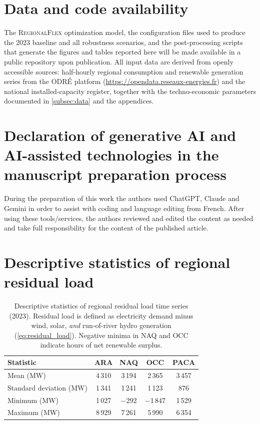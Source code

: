 \documentclass[12pt]{article}
\begin{document}
\section*{Data and code availability}

\noindent The \textsc{RegionalFlex} optimization model, the configuration files used to produce the 2023 baseline and all robustness scenarios, and the post-processing scripts that generate the figures and tables reported here will be made available in a public repository upon publication. All input data are derived from openly accessible sources: half-hourly regional consumption and renewable generation series from the ODR\'E platform (\url{https://opendata.reseaux-energies.fr}) and the national installed-capacity register, together with the techno-economic parameters documented in \cref{subsec:data} and the appendices.

\section*{Declaration of generative AI and AI-assisted technologies in the manuscript preparation process}

\noindent During the preparation of this work the authors used ChatGPT, Claude and Gemini in order to assist with coding and language editing from French. After using these tools/services, the authors reviewed and edited the content as needed and take full responsibility for the content of the published article.





\appendix
\section{Descriptive statistics of regional residual load}\label{app:residual_load}

\begin{table}[H]
\centering
\label{tab:residual_load_stats}
\setlength{\tabcolsep}{6pt}
\renewcommand{\arraystretch}{1.25}
\begin{tabular}{lcccc}
\toprule
\textbf{Statistic} 
& \textbf{ARA} 
& \textbf{NAQ} 
& \textbf{OCC} 
& \textbf{PACA} \\
\midrule
Mean (MW)      & 4\,310 & 3\,194 & 2\,365 & 3\,457 \\
Standard deviation (MW) & 1\,341 & 1\,241 & 1\,123 &   876 \\
Minimum (MW)  & 1\,027 & $-$292 & $-$1\,847 & 1\,529 \\
Maximum (MW)  & 8\,929 & 7\,261 & 5\,990 & 6\,354 \\
\bottomrule
\end{tabular}
\caption{Descriptive statistics of regional residual load time series (2023).
Residual load is defined as electricity demand minus wind, solar, \emph{and} run-of-river hydro generation (\cref{eq:residual_load}). Negative minima in NAQ and OCC indicate hours of net renewable surplus.}
\end{table}
\end{document}

